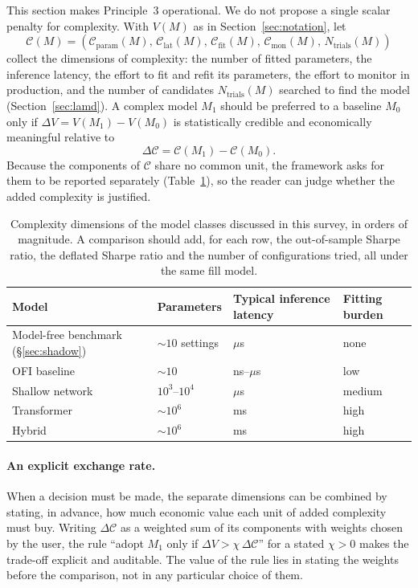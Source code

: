 This section makes Principle~3 operational. We do not propose a single scalar penalty for
complexity. With $V(M)$ as in
Section~\ref{sec:notation}, let
\begin{equation}
  \mathcal{C}(M) = \left(\mathcal{C}_{\text{param}}(M),\, \mathcal{C}_{\text{lat}}(M),\,
  \mathcal{C}_{\text{fit}}(M),\, \mathcal{C}_{\text{mon}}(M),\, N_{\text{trials}}(M)\right)
\end{equation}
collect the dimensions of complexity: the number of fitted parameters, the inference latency, the
effort to fit and refit its parameters, the effort to monitor in production, and the number of
candidates $N_{\text{trials}}(M)$ searched to find the model (Section~\ref{sec:lamd}).
 A complex model
$M_1$ should be preferred to a baseline $M_0$ only if $\Delta V = V(M_1) - V(M_0)$ is statistically
credible and economically meaningful relative to 
\[
  \Delta\mathcal{C} = \mathcal{C}(M_1) - \mathcal{C}(M_0).
\]
Because the
components of $\mathcal{C}$ share no common unit, the framework asks for them to be reported separately
(Table~\ref{tab:parsimony}), so the reader can judge whether the added complexity is justified.

\begin{table}[!htbp]
\centering\small
\caption{Complexity dimensions of the model classes discussed in this survey, in orders of
magnitude. A comparison should add, for each row, the out-of-sample Sharpe ratio, the deflated
Sharpe ratio and the number of configurations tried, all under the same fill model.}
\label{tab:parsimony}
\begin{tabular}{llll}
\toprule
Model & Parameters & Typical inference latency & Fitting burden \\
\midrule
Model-free benchmark (\S\ref{sec:shadow}) & $\sim 10$ settings & $\mu$s & none \\
OFI baseline & $\sim 10$ & ns--$\mu$s & low \\
Shallow network & $10^3$--$10^4$ & $\mu$s & medium \\
Transformer & $\sim 10^6$ & ms & high \\
Hybrid & $\sim 10^6$ & ms & high \\
\bottomrule
\end{tabular}
\end{table}

\paragraph{An explicit exchange rate.} When a decision must be made, the separate dimensions can be
combined by stating, in advance, how much economic value each unit of added complexity must buy.
Writing $\Delta\mathcal{C}$ as a weighted sum of its components with weights chosen by the user, the
rule ``adopt $M_1$ only if $\Delta V > \chi\,\Delta\mathcal{C}$'' for a stated $\chi > 0$ makes
the trade-off explicit and auditable. The value of the rule lies in stating the weights before the
comparison, not in any particular choice of them.

